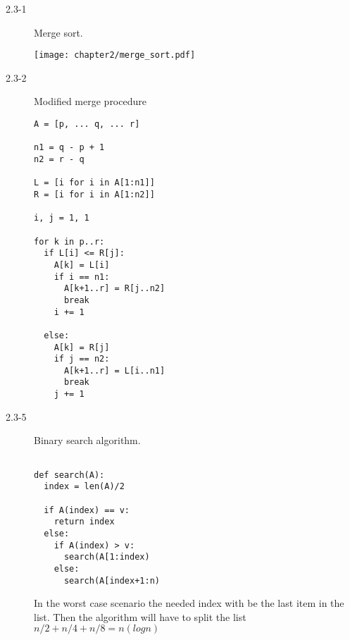 \begin{description}
 \item[2.3-1] Merge sort.
 \begin{center}
 \texttt{[image: chapter2/merge\_sort.pdf]}
 \end{center}

\item[2.3-2] Modified merge procedure
\begin{lstlisting}
A = [p, ... q, ... r]

n1 = q - p + 1
n2 = r - q

L = [i for i in A[1:n1]]
R = [i for i in A[1:n2]]

i, j = 1, 1

for k in p..r:
  if L[i] <= R[j]:
    A[k] = L[i]
    if i == n1:
      A[k+1..r] = R[j..n2]
      break
    i += 1

  else:
    A[k] = R[j]
    if j == n2:
      A[k+1..r] = L[i..n1]
      break
    j += 1
\end{lstlisting}


\item[2.3-5] Binary search algorithm.
\begin{lstlisting}

def search(A):
  index = len(A)/2
  
  if A(index) == v:
    return index
  else:
    if A(index) > v:
      search(A[1:index)
    else:
      search(A[index+1:n)
\end{lstlisting}
In the worst case scenario the needed index with be the last item in the list. Then the
algorithm will have to split the list $n/2 + n/4 + n/8 = n(logn)\dfrac{}{}$
\end{description}





